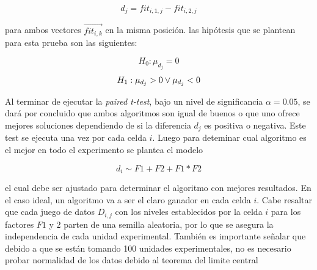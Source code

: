 \begin{equation}
    \label{eq:products_by_storage}
    d_j = fit_{i,1,j} - fit_{i,2,j}
\end{equation}

para ambos vectores $\overrightarrow{fit_{i,k}}$ en la misma posición. las hipótesis que se plantean para esta prueba son las siguientes:

\[
    H_0: \mu_{d_j} = 0
\]
\[
    H_1: \mu_{d_j} > 0 \space \lor \space \mu_{d_j} < 0
\]

Al terminar de ejecutar la \textit{paired t-test}, bajo un nivel de significancia $\alpha = 0.05$, se dará por concluido que ambos algoritmos son igual de buenos o que uno ofrece mejores soluciones dependiendo de si la diferencia $d_j$ es positiva o negativa. Este test se ejecuta una vez por cada celda $i$. Luego para deteminar cual algoritmo es el mejor en todo el experimento se plantea el modelo

\begin{equation}
    \label{eq:products_by_storage}
    d_i \sim F1 + F2 + F1*F2
\end{equation}

el cual debe ser ajustado para determinar el algoritmo con mejores resultados. En el caso ideal, un algoritmo va a ser el claro ganador en cada celda $i$. Cabe resaltar que cada juego de datos $D_{i,j}$ con los niveles establecidos por la celda $i$ para los factores $F1$ y $2$ parten de una semilla aleatoria, por lo que se asegura la independencia de cada unidad experimental. También es importante señalar que debido a que se están tomando 100 unidades experimentales, no es necesario probar normalidad de los datos debido al teorema del limite central